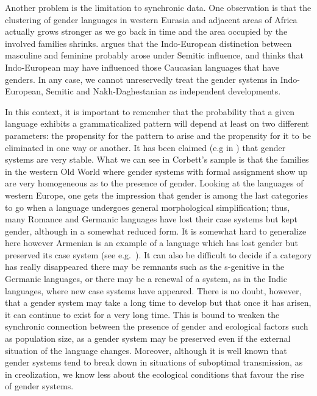 \documentclass[output=collectionpaper]{langsci/langscibook}
\begin{document}
Another problem is the limitation to synchronic data. One observation is that the clustering of gender languages in western Eurasia and adjacent areas of Africa actually grows stronger as we go back in time and the area occupied by the involved families shrinks. \citet[252]{Levins2002} argues that the Indo-European distinction between masculine and feminine probably arose under Semitic influence, and \citet{Matasovic2012} thinks that Indo-European may have influenced those Caucasian languages that have genders. In any case, we cannot unreservedly treat the gender systems in Indo-European, Semitic and Nakh-Daghestanian as independent developments.

In this context, it is important to remember that the probability that a given language exhibits a grammaticalized pattern will depend at least on two different parameters: the propensity for the pattern to arise and the propensity for it to be eliminated in one way or another. It has been claimed (e.g in \citealt[199]{Dahl2004}) that gender systems are very stable. What we can see in Corbett’s sample is that the families in the western Old World where gender systems with formal assignment show up are very homogeneous as to the presence of gender. Looking at the languages of western Europe, one gets the impression that gender is among the last categories to go when a language undergoes general morphological simplification; thus, many Romance and Germanic languages have lost their case systems but kept gender, although in a somewhat reduced form. It is somewhat hard to generalize here however \textendash{} Armenian is an example of a language which has lost gender but preserved its case system (see e.g.\ \citealt{Kulikov2006}). It can also be difficult to decide if a category has really disappeared \textendash{} there may be remnants such as the s-genitive in the Germanic languages, or there may be a renewal of a system, as in the Indic languages, where new case systems have appeared. There is no doubt, however, that a gender system may take a long time to develop but that once it has arisen, it can continue to exist for a very long time. This is bound to weaken the synchronic connection between the presence of gender and ecological factors such as population size, as a gender system may be preserved even if the external situation of the language changes. Moreover, although it is well known that gender systems tend to break down in situations of suboptimal transmission, as in creolization, we know less about the ecological conditions that favour the rise of gender systems.
\end{document}
